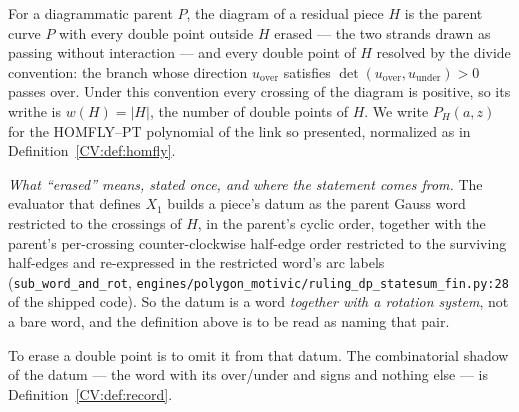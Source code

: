 \begin{definition}\label{CV:def:piecediagram}\leanok{}
For a diagrammatic parent $P$, the diagram of a residual piece $H$ is the parent
curve $P$ with every double
point outside $H$ erased --- the two strands drawn as passing without
interaction --- and every double point of $H$ resolved by the divide convention:
the branch whose direction $u_{\mathrm{over}}$ satisfies
$\det(u_{\mathrm{over}},u_{\mathrm{under}})>0$ passes over. Under this convention
every crossing of the diagram is positive, so its writhe is
$w(H)=|H|$, the number of double points of $H$. We write $P_H(a,z)$ for the
HOMFLY--PT polynomial of the link so presented, normalized as in
Definition~\ref{CV:def:homfly}.

\emph{What ``erased'' means, stated once, and where the statement comes from.}
The evaluator that defines $X_1$ builds a piece's datum as the parent Gauss word
restricted to the crossings of $H$, in the parent's cyclic order, together with
the parent's per-crossing counter-clockwise half-edge order restricted to the
surviving half-edges and re-expressed in the restricted word's arc labels
(\texttt{sub\_word\_and\_rot},
\texttt{engines/polygon\_motivic/ruling\_dp\_statesum\_fin.py:28} of the shipped
code). So the datum is a word \emph{together with a rotation system}, not a bare
word, and the definition above is to be read as naming that pair.

To erase a double point is to omit it from that datum. The combinatorial shadow
of the datum --- the word with its over/under and signs and nothing else --- is
Definition~\ref{CV:def:record}.
\end{definition}

